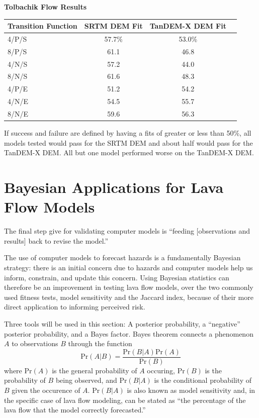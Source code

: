 \documentclass[12pt,letter]{article}
\begin{document}
		\newpage
		\begin{center}
			\textbf{Tolbachik Flow Results}\\
			\begin{tabular}{l c c c}
				\toprule
				Transition Function&SRTM DEM Fit&TanDEM-X DEM Fit\\
				\midrule
				4/P/S & 57.7\%& 53.0\%\\
				8/P/S & 61.1  & 46.8\\
				4/N/S & 57.2  & 44.0\\
				8/N/S & 61.6  & 48.3\\
				4/P/E & 51.2  & 54.2\\
				4/N/E & 54.5  & 55.7\\
				8/N/E & 59.6  & 56.3\\
				
				\bottomrule
			\end{tabular}
		\end{center}

		If success and failure are defined by having a fits of greater or less than 50\%, all models tested would pass for the SRTM DEM and about half would pass for the TanDEM-X DEM. All but one model performed worse on the TanDEM-X DEM.


\section{Bayesian Applications for Lava Flow Models}\label{sec:Bayesian}
	The final step \citet{bayarri2007framework} give for validating computer models is ``feeding [observations and results] back to revise the model.''
	
	The use of computer models to forecast hazards is a fundamentally Bayesian strategy: there is an initial concern due to hazards and computer models help us inform, constrain, and update this concern. Using Bayesian statistics can therefore be an improvement in testing lava flow models, over the two commonly used fitness tests, model sensitivity and the Jaccard index, because of their more direct application to informing perceived risk. 
	
	Three tools will be used in this section: A posterior probability, a ``negative'' posterior probability, and a Bayes factor. Bayes theorem connects a phenomenon $A$ to observations $B$ through the function
	\begin{equation}
		\text{Pr}(A|B)=\frac{\text{Pr}(B|A)\text{Pr}(A)}{\text{Pr}(B)}\label{eq_bayes}
	\end{equation}
	where $\text{Pr}(A)$ is the general probability of $A$ occuring, $\text{Pr}(B)$ is the probability of $B$ being observed, and $\text{Pr}(B|A)$ is the conditional probability of $B$ given the occurence of $A$. $\text{Pr}(B|A)$ is also known as model sensitivity and, in the specific case of lava flow modeling, can be stated as ``the percentage of the lava flow that the model correctly forecasted.''
	
\end{document}
